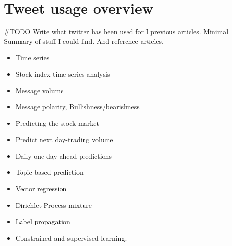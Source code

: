 \chapter{Tweet usage overview}


#TODO Write what twitter has been used for I previous articles. Minimal Summary
of stuff I could find. And reference articles.  
\begin{itemize}
    \item Time series
    \item Stock index time series analysis
    \item Message volume
    \item Message polarity, Bullishness/bearishness
    \item Predicting the stock market
    \item Predict next day-trading volume
    \item Daily one-day-ahead predictions
    \item Topic based prediction
    \item Vector regression
    \item Dirichlet Process mixture
    \item Label propagation
    \item Constrained and supervised learning. 
\end{itemize}
